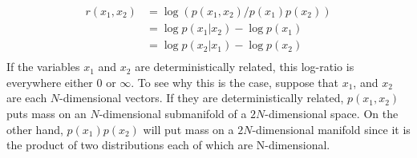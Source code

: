 %
%
%
%
%
\begin{align*}
r(x_1, x_2) &= \log \left( p(x_1, x_2) / p(x_1) p(x_2)\right) \\
&= \log p(x_1 | x_2)  - \log p(x_1) \\
&= \log p(x_2 | x_1)  - \log p(x_2) \\
\end{align*}
%
If the variables $x_1$ and $x_2$ are deterministically related, this log-ratio is everywhere either $0$ or $\infty$.
To see why this is the case, suppose that $x_1$, and $x_2$ are each $N$-dimensional vectors.
If they are deterministically related, $p(x_1, x_2)$ puts mass on an $N$-dimensional submanifold of a $2N$-dimensional space.
On the other hand, $p(x_1)p(x_2)$ will put mass on a $2N$-dimensional manifold since it is the product of two distributions each of which are N-dimensional.

